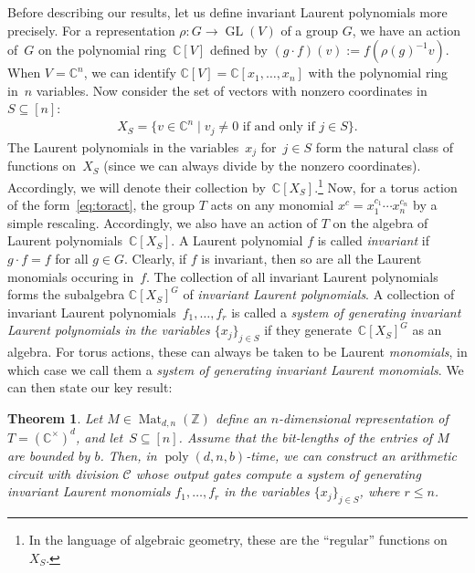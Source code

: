 \documentclass[10pt,a4paper]{article}
\DeclareMathOperator{\GL}{GL}
\DeclareMathOperator{\poly}{poly}
\DeclareMathOperator{\Mat}{Mat}
\newtheorem{theorem}{Theorem}[section]
\theoremstyle{definition}
\numberwithin{equation}{section}
\newcommand{\CC}{\mathbb{C}}
\newcommand{\ZZ}{\mathbb{Z}}
\begin{document}
Before describing our results, let us define invariant Laurent polynomials more precisely.
For a representation $\rho\colon G \rightarrow \GL(V)$ of a group $G$, we have an action of~$G$ on the polynomial ring~$\CC[V]$
defined by $(g \cdot f) (v) := f(\rho(g)^{-1}v)$.
When $V=\CC^n$, we can identify $\CC[V]=\CC[x_1,\dots,x_n]$ with the polynomial ring in~$n$ variables.
Now consider the set of vectors with nonzero coordinates in~$S\subseteq[n]$:
\begin{align*}
  X_S = \{ v \in \CC^n \;|\; v_j \neq 0 \text{ if and only if } j \in S \}.
\end{align*}
The Laurent polynomials in the variables~$x_j$ for~$j \in S$ form the natural class of functions on~$X_S$ (since we can always divide by the nonzero coordinates).
Accordingly, we will denote their collection by~$\CC[X_S]$.\footnote{In the language of algebraic geometry, these are the ``regular'' functions on~$X_S$.}
Now, for a torus action of the form~\eqref{eq:toract}, the group $T$ acts on any monomial $x^c=x_1^{c_1} \cdots x_n^{c_n}$ by a simple rescaling.
Accordingly, we also have an action of $T$ on the algebra of Laurent polynomials~$\CC[X_S]$.
A Laurent polynomial $f$ is called \emph{invariant} if $g \cdot f = f$ for all $g \in G$.
Clearly, if $f$ is invariant, then so are all the Laurent monomials occuring in~$f$.
The collection of all invariant Laurent polynomials forms the subalgebra $\CC[X_S]^G$ of \emph{invariant Laurent polynomials}.
A collection of invariant Laurent polynomials~$f_1,\dots,f_r$ is called
a \emph{system of generating invariant Laurent polynomials in the variables $\{x_j\}_{j\in S}$}
if they generate~$\CC[X_S]^G$ as an algebra.
For torus actions, these can always be taken to be Laurent \emph{monomials}, in which case we call them a \emph{system of generating invariant Laurent monomials}.
We can then state our key result:

\begin{theorem}\label{th:laurent}
Let $M \in\Mat_{d,n}(\ZZ)$ define an $n$-dimensional representation of $T = (\CC^\times)^d$, and let~$S \subseteq [n]$.
Assume that the bit-lengths of the entries of $M$ are bounded by $b$.
Then, in $\poly(d,n,b)$-time, we can construct an arithmetic circuit with division $\mathcal{C}$ whose output gates compute a system of generating invariant Laurent monomials $f_1,\dots,f_r$ in the variables $\{x_j\}_{j\in S}$, where $r \leq n$.
\end{theorem}
\end{document}
